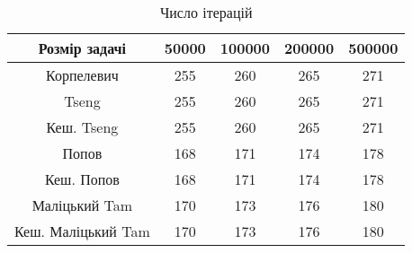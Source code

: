 \begin{table}[H]
	\centering
	\begin{tabular}{|c||c|c|c|c|}\hline
		Розмір задачі & 50000 & 100000 & 200000 & 500000 \\ \hline \hline
		Корпелевич & 255 & 260 & 265 & 271 \\ \hline
		Tseng & 255 & 260 & 265 & 271 \\ \hline
		Кеш. Tseng & 255 & 260 & 265 & 271 \\ \hline
		Попов & 168 & 171 & 174 & 178 \\ \hline
		Кеш. Попов & 168 & 171 & 174 & 178 \\ \hline
		Маліцький Tam & 170 & 173 & 176 & 180 \\ \hline
		Кеш. Маліцький Tam & 170 & 173 & 176 & 180 \\ \hline
	\end{tabular}
	\caption{Число ітерацій}
\end{table}
